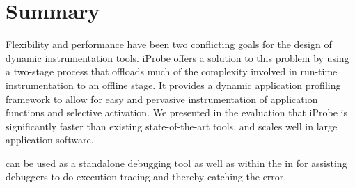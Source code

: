\section{Summary}
\label{sec:iProbeSummary}

Flexibility and performance have been two conflicting goals for the design of dynamic instrumentation tools.
iProbe offers a solution to this problem by using a two-stage process that offloads much of the complexity involved in run-time instrumentation to an offline stage. 
It provides a dynamic application profiling framework to allow for easy and pervasive instrumentation of application functions
and selective activation. 
We presented in the evaluation that iProbe is significantly faster than existing state-of-the-art tools, and scales well in large application software.

\iprobe can be used as a standalone debugging tool as well as within the \debugcontainer in \parikshan for assisting debuggers to do execution tracing and thereby catching the error.


